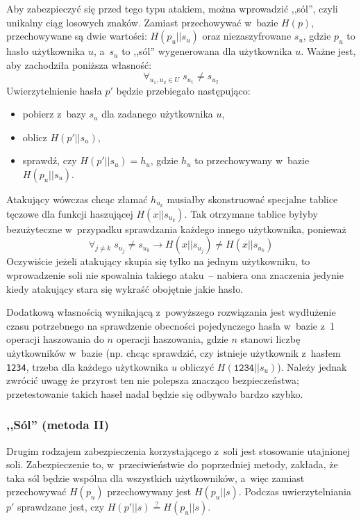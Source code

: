 Aby zabezpieczyć się przed tego typu atakiem, można wprowadzić ,,sól'', czyli
unikalny ciąg losowych znaków. Zamiast przechowywać w~bazie $H(p)$,
przechowywane są dwie wartości: $H(p_u || s_u)$ oraz niezaszyfrowane $s_u$,
gdzie $p_u$ to hasło użytkownika $u$, a~$s_u$ to ,,sól'' wygenerowana dla
użytkownika $u$. Ważne jest, aby zachodziła poniższa własność:
    $$\forall_{u_1, u_2 \in U} \; s_{u_1} \neq s_{u_2}$$
Uwierzytelnienie hasła $p'$ będzie przebiegało następująco:

\begin{itemize}
\item pobierz z~bazy $s_u$ dla zadanego użytkownika $u$,
\item oblicz $H(p'||s_u)$,
\item sprawdź, czy $H(p'||s_u) = h_u$, gdzie $h_u$ to przechowywany w~bazie
$H(p_u||s_u)$.
\end{itemize}

Atakujący wówczas chcąc złamać $h_{u_k}$ musiałby skonstruować specjalne
tablice tęczowe dla funkcji haszującej $H(x||s_{u_k})$. Tak otrzymane tablice
byłyby bezużyteczne w~przypadku sprawdzania każdego innego użytkownika,
ponieważ
    $$\forall_{j \neq k} \; s_{u_j} \neq s_{u_k} \rightarrow H(x||s_{u_j}) \neq
    H(x||s_{u_k})$$
Oczywiście jeżeli atakujący skupia się tylko na jednym użytkowniku, to
wprowadzenie soli nie spowalnia takiego ataku~-- nabiera ona znaczenia jedynie
kiedy atakujący stara się wykraść obojętnie jakie hasło.

Dodatkową własnością wynikającą z~powyższego rozwiązania jest wydłużenie czasu
potrzebnego na sprawdzenie obecności pojedynczego hasła w~bazie z~1 operacji
haszowania do $n$ operacji haszowania, gdzie $n$ stanowi liczbę użytkowników
w~bazie (np. chcąc sprawdzić, czy istnieje użytkownik z~hasłem \texttt{1234},
trzeba dla każdego użytkownika $u$ obliczyć $H(\texttt{1234}||s_u)$). Należy
jednak zwrócić uwagę że przyrost ten nie polepsza znacząco bezpieczeństwa;
przetestowanie takich haseł nadal będzie się odbywało bardzo szybko.

\label{salt_2}%
\subsubsection{,,Sól'' (metoda II)}
Drugim rodzajem zabezpieczenia korzystającego z~soli jest stosowanie utajnionej
soli. Zabezpieczenie to, w~przeciwieństwie do poprzedniej metody, zakłada, że
taka sól będzie wspólna dla wszystkich użytkowników, a~więc zamiast
przechowywać $H(p_u)$ przechowywany jest $H(p_u||s)$. Podczas uwierzytelniania
$p'$ sprawdzane jest, czy $H(p'||s) \stackrel{?}{=} H(p_u||s)$.

